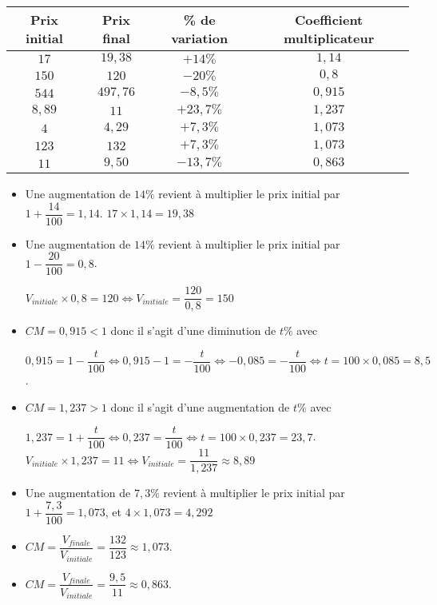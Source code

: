 \documentclass[a4paper]{article}
\renewcommand\euro{\officialeuro\xspace}
\begin{document}
  \begin{exercice}{}{}
$~$
    \begin{center}
      \begin{tabular}{|c|c|c|c|}
        \hline 
        \cellcolor{Blue!15!white}\textbf{Prix initial} & \cellcolor{Blue!15!white}\textbf{Prix final} & \cellcolor{Blue!15!white}\textbf{\% de variation} & \cellcolor{Blue!15!white}\textbf{Coefficient multiplicateur} \\
        \hline
        $17$\euro & $19,38$\euro & $+14\%$ & $1,14$ \\
        \hline
        $150$\euro& $120$\euro&  $-20\%$& $0,8$ \\
        \hline
        $544$\euro& $497,76$ & $-8,5\%$ & $0,915$\\
        \hline
        $8,89$\euro & $11$\euro& $+23,7\%$ & $1,237$\\
        \hline
        $4$\euro& $4,29$\euro& $+7,3\%$& $1,073$\\
        \hline
        $123$\euro& $132$\euro &$+7,3\%$ & $1,073$\\
        \hline
        $11$\euro& $9,50$\euro& $-13,7\%$ & $0,863$ \\
        \hline
      \end{tabular}
    \end{center}
        

    \begin{itemize}
      \item Une augmentation de $14\%$  revient à multiplier le prix initial par  $1+\dfrac{14}{100}=1,14$. $17\times 1,14=19,38$
      \item Une augmentation de $14\%$  revient à multiplier le prix initial par  $1-\dfrac{20}{100}=0,8$.
      
      $V_{initiale}\times 0,8 = 120 \iff V_{initiale}= \dfrac{120}{0,8}=150$ 
      \item $CM=0,915<1$ donc il s'agit d'une diminution de $t\%$ avec
      
      $0,915=1-\dfrac{t}{100} \iff 0,915-1=-\dfrac{t}{100} \iff -0,085=-\dfrac{t}{100} \iff t=100\times 0,085=8,5$.
      \item $CM=1,237>1$ donc il s'agit d'une augmentation de $t\%$ avec
      
      $1,237=1+\dfrac{t}{100} \iff 0,237=\dfrac{t}{100} \iff t=100\times 0,237=23,7$. $V_{initiale}\times 1,237 = 11 \iff V_{initiale}= \dfrac{11}{1,237}\approx 8,89$ 
      \item Une augmentation de $7,3\%$  revient à multiplier le prix initial par  $1+\dfrac{7,3}{100}=1,073$, et $4\times 1,073=4,292$
      \item $CM=\dfrac{V_{finale}}{V_{initiale}}=\dfrac{132}{123}\approx 1,073$.
      \item $CM=\dfrac{V_{finale}}{V_{initiale}}=\dfrac{9,5}{11}\approx 0,863$.
    \end{itemize}
  \end{exercice}
    
\end{document}
